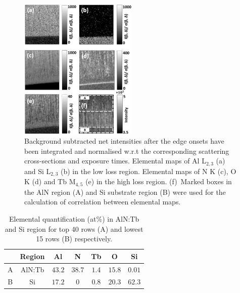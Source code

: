 \documentclass[%
aip,
rsi,%
 amsmath,amssymb,%
 reprint,%
]{revtex4-1}
\begin{document}
\begin{figure}%
    \includegraphics[width=0.5\textwidth]{combined_maps}
    \caption{Background subtracted net intensities after the edge onsets have been integrated and normalised w.r.t the corresponding scattering cross-sections and exposure times. Elemental maps of Al L$_{2,3}$ (a) and Si L$_{2,3}$ (b) in the low loss region. Elemental maps of N K (c), O K (d) and Tb M$_{4,5}$ (e) in the high loss region. (f)~Marked boxes in the AlN region (A) and Si substrate region (B) were used for the calculation of correlation between elemental maps.}
    \label{fig:combined_maps}
\end{figure}
\begin{table}%
	\caption{Elemental quantification (at\%) in AlN:Tb and Si region for top 40 rows (A) and lowest 15 rows (B) respectively.}
    \label{tab:atper}
    \begin{ruledtabular}
    	\begin{tabular}{ccccccc}
        	&Region&Al&N&Tb&O&Si						 \\ \hline
            A&AlN:Tb&$43.2$&$38.7$&$1.4$&$15.8$&$0.01$   \\
            B&Si &$17.2$&$0$&$0.8$&$20.3$&$62.3$
    	\end{tabular}
    \end{ruledtabular}
\end{table}
\end{document}
